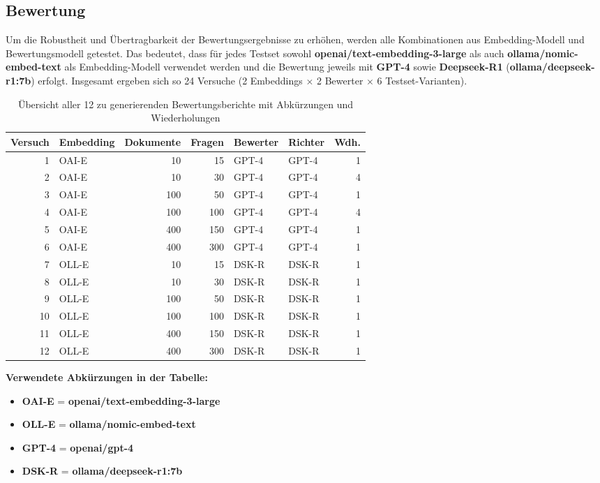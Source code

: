 \subsection{Bewertung}
\label{sec:bewertung}
Um die Robustheit und Übertragbarkeit der Bewertungsergebnisse zu erhöhen, werden alle Kombinationen aus Embedding-Modell und Bewertungsmodell getestet. Das bedeutet, dass für jedes Testset sowohl \textbf{openai/text-embedding-3-large} als auch \textbf{ollama/nomic-embed-text} als Embedding-Modell verwendet werden und die Bewertung jeweils mit \textbf{GPT-4} sowie \textbf{Deepseek-R1} (\textbf{ollama/deepseek-r1:7b}) erfolgt. Insgesamt ergeben sich so 24 Versuche (2 Embeddings $\times$ 2 Bewerter $\times$ 6 Testset-Varianten).
\begin{table}[htbp]
    \centering
    \caption[Übersicht der Versuche]{Übersicht aller 12 zu generierenden Bewertungsberichte mit Abkürzungen und Wiederholungen}
    \begin{tabular}{|r|l|r|r|l|l|r|}
        \hline
        \textbf{Versuch} & \textbf{Embedding} & \textbf{Dokumente} & \textbf{Fragen} & \textbf{Bewerter} & \textbf{Richter} & \textbf{Wdh.} \\
        \hline
        1  & OAI-E & 10   & 15  & GPT-4 & GPT-4 & 1 \\
        2  & OAI-E & 10   & 30  & GPT-4 & GPT-4 & 4 \\
        3  & OAI-E & 100  & 50  & GPT-4 & GPT-4 & 1 \\
        4  & OAI-E & 100  & 100 & GPT-4 & GPT-4 & 4 \\
        5  & OAI-E & 400 & 150 & GPT-4 & GPT-4 & 1 \\
        6  & OAI-E & 400 & 300 & GPT-4 & GPT-4 & 1 \\
        \hline
        7  & OLL-E & 10   & 15  & DSK-R & DSK-R & 1 \\
        8  & OLL-E & 10   & 30  & DSK-R & DSK-R & 1 \\
        9  & OLL-E & 100  & 50  & DSK-R & DSK-R & 1 \\
        10 & OLL-E & 100  & 100 & DSK-R & DSK-R & 1 \\
        11 & OLL-E & 400 & 150 & DSK-R & DSK-R & 1 \\
        12 & OLL-E & 400 & 300 & DSK-R & DSK-R & 1 \\
        \hline
    \end{tabular}
    \label{tab:bewertungsberichte}
\end{table}

\noindent
\textbf{Verwendete Abkürzungen in der Tabelle:}
\begin{itemize}
    \item \textbf{OAI-E} = \textbf{openai/text-embedding-3-large}
    \item \textbf{OLL-E} = \textbf{ollama/nomic-embed-text}
    \item \textbf{GPT-4} = \textbf{openai/gpt-4}
    \item \textbf{DSK-R} = \textbf{ollama/deepseek-r1:7b}
\end{itemize}